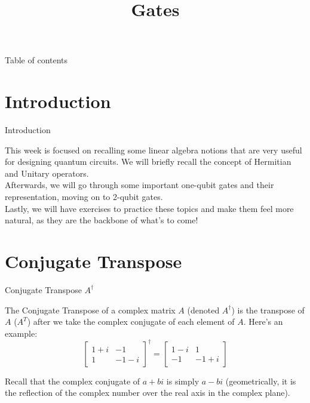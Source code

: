 \documentclass[aspectratio=43]{beamer}
\title{\q Gates}
\begin{document}
\begin{frame}
	\titlepage
\end{frame}


\begin{frame}{Table of contents}
	\begin{card}
		\tableofcontents
	\end{card}
\end{frame}


\section{Introduction}
\begin{frame}{Introduction}
    \begin{card}
    This week is focused on recalling some linear algebra notions that are very useful for designing quantum circuits. We will briefly recall the concept of Hermitian and Unitary operators.\\ Afterwards, we will go through some important one-qubit gates and their \qk representation, moving on to 2-qubit gates.\\Lastly, we will have exercises to practice these topics and make them feel more natural, as they are the backbone of what's to come!
    \end{card}
\pagenumber
\end{frame}

\section{Conjugate Transpose}
\begin{frame}{Conjugate Transpose $A^\dag$}
\begin{card}
    The Conjugate Transpose of a complex matrix $A$ (denoted $A^\dag$) is the transpose of $A$ ($A^T$) after we take the complex conjugate of each element of $A$. 
    Here's an example:
    \begin{equation*}
        \begin{bmatrix}1 + i & -1\\ 1 & -1 - i\end{bmatrix}^\dag
        =
        \begin{bmatrix}1 - i & 1\\ -1 & -1 + i\end{bmatrix}
    \end{equation*}
\end{card}
\begin{cardTiny}
    Recall that the complex conjugate of $a+bi$ is simply $a-bi$ (geometrically, it is the reflection of the complex number over the real axis in the complex plane).
\end{cardTiny}
\pagenumber
\end{frame}
\end{document}
